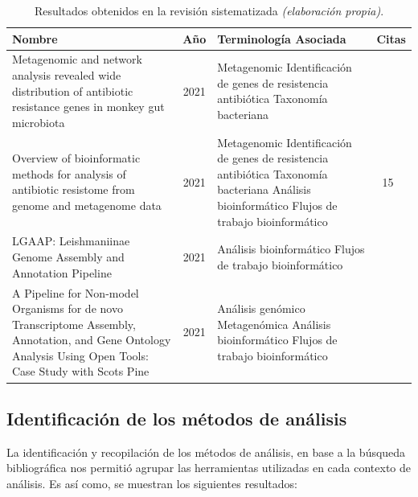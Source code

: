 \documentclass[12pt]{article}
\begin{document}
\begin{table}[htbp]
    \centering
    \caption{Resultados obtenidos en la revisión sistematizada \emph{(elaboración propia)}.}
    \label{tabla:resultados}
    \begin{tabularx}{\textwidth}{|>{\raggedright\arraybackslash}X|c|>{\raggedright\arraybackslash}X|>{\raggedright\arraybackslash}X|}
        \hline
        \textbf{Nombre} & \textbf{Año} & \textbf{Terminología Asociada} & \textbf{Citas} \\
        \hline
        Metagenomic and network analysis revealed wide distribution of antibiotic resistance genes in monkey gut microbiota
        & 2021 & Metagenomic \newline Identificación de genes de resistencia antibiótica \newline Taxonomía bacteriana & 9 \\
        \hline
        Overview of bioinformatic methods for analysis of antibiotic resistome from genome and metagenome data
        & 2021 & Metagenomic \newline Identificación de genes de resistencia antibiótica \newline Taxonomía bacteriana \newline Análisis bioinformático \newline Flujos de trabajo bioinformático & ~15 \\
        \hline
        LGAAP: Leishmaniinae Genome Assembly and Annotation Pipeline
        & 2021 & Análisis bioinformático \newline Flujos de trabajo bioinformático & 5\\
        \hline
        A Pipeline for Non-model Organisms for de novo Transcriptome Assembly, Annotation, and Gene Ontology Analysis Using Open Tools: Case Study with Scots Pine
        & 2021 & Análisis genómico \newline Metagenómica \newline Análisis bioinformático \newline Flujos de trabajo bioinformático & 6 \\
        \hline
    \end{tabularx}
\end{table}

\subsection{Identificación de los métodos de análisis}

La identificación y recopilación de los métodos de análisis, 
en base a la búsqueda bibliográfica nos permitió agrupar las 
herramientas utilizadas en cada contexto de análisis. Es así como, 
se muestran los siguientes resultados:
\end{document}

